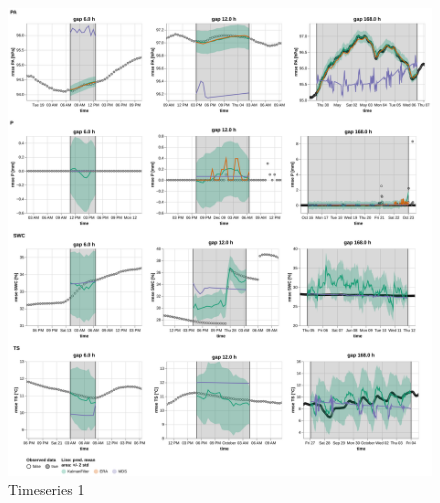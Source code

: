 \documentclass{article}
\newcommand{\imgwidth}{6in}
\begin{document}
\begin{figure}
\centerline{\includegraphics[width=\imgwidth]{timeseries_2_1}}
\caption{Timeseries 1}
\label{fig:ts_2_1}
\end{figure}
\end{document}
